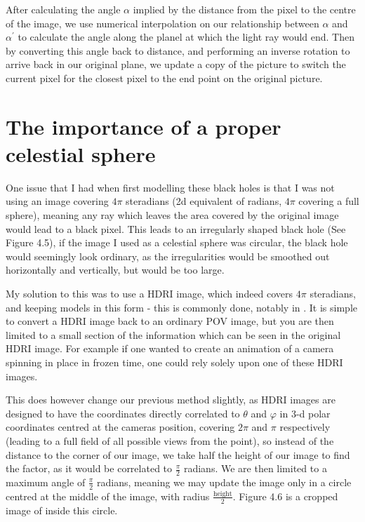 \documentclass[oneside,openright,frontopenright, singlespacing]{dmathesis}
\begin{document}
\vspace{1em}
	After calculating the angle $\alpha$ implied by the distance from the pixel to the centre of the image, we use numerical interpolation on our relationship between $\alpha$ and $\alpha^{'}$ to calculate the angle along the planel at which the light ray would end. Then by converting this angle back to distance, and performing an inverse rotation to arrive back in our original plane, we update a copy of the picture to switch the current pixel for the closest pixel to the end point on the original picture.

\section{The importance of a proper celestial sphere}

	One issue that I had when first modelling these black holes is that I was not using an image covering $4\pi$ steradians (2d equivalent of radians, $4\pi$ covering a full sphere), meaning any ray which leaves the area covered by the original image would lead to a black pixel. This leads to an irregularly shaped black hole (See Figure 4.5), if the image I used as a celestial sphere was circular, the black hole would seemingly look ordinary, as the irregularities would be smoothed out horizontally and vertically, but would be too large. 

\vspace{1em}
	My solution to this was to use a HDRI image, which indeed covers $4\pi$ steradians, and keeping models in this form - this is commonly done, notably in \cite{thorne2015gravitational}. It is simple to convert a HDRI image back to an ordinary POV image, but you are then limited to a small section of the information which can be seen in the original HDRI image. For example if one wanted to create an animation of a camera spinning in place in frozen time, one could rely solely upon one of these HDRI images.

\vspace{1em}
	This does however change our previous method slightly, as HDRI images are designed to have the coordinates directly correlated to $\theta$ and $\varphi$ in 3-d polar coordinates centred at the cameras position, covering $2\pi$ and $\pi$ respectively (leading to a full field of all possible views from the point), so instead of the distance to the corner of our image, we take half the height of our image to find the factor, as it would be correlated to $\frac{\pi}{2}$ radians. We are then limited to a maximum angle of $\frac{\pi}{2}$ radians, meaning we may update the image only in a circle centred at the middle of the image, with radius $\frac{\mbox{height}}{2}$. Figure 4.6 is a cropped image of inside this circle.
\end{document}
